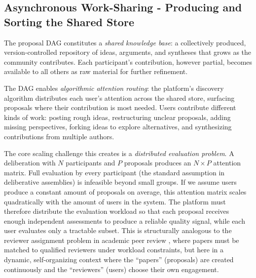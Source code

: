 \documentclass[a4paper, 12pt, twoside]{iviathesis}
\begin{document}
\subsection{Asynchronous Work-Sharing - Producing and Sorting the Shared Store}
\label{sec:async-work-sharing}

The proposal DAG constitutes a \textit{shared knowledge base}: a collectively produced, version-controlled repository of ideas, arguments, and syntheses that grows as the community contributes. Each participant's contribution, however partial, becomes available to all others as raw material for further refinement.

The DAG enables \textit{algorithmic attention routing}: the platform's discovery algorithm distributes each user's attention across the shared store, surfacing proposals where their contribution is most needed. Users contribute different kinds of work: posting rough ideas, restructuring unclear proposals, adding missing perspectives, forking ideas to explore alternatives, and synthesizing contributions from multiple authors.

The core scaling challenge this creates is a \textit{distributed evaluation problem}. A deliberation with $N$ participants and $P$ proposals produces an $N \times P$ attention matrix. Full evaluation by every participant (the standard assumption in deliberative assemblies) is infeasible beyond small groups. If we assume users produce a constant amount of proposals on average, this attention matrix scales quadratically with the amount of users in the system. The platform must therefore distribute the evaluation workload so that each proposal receives enough independent assessments to produce a reliable quality signal, while each user evaluates only a tractable subset. This is structurally analogous to the reviewer assignment problem in academic peer review \cite{charlin2013}, where papers must be matched to qualified reviewers under workload constraints, but here in a dynamic, self-organizing context where the ``papers'' (proposals) are created continuously and the ``reviewers'' (users) choose their own engagement.
\end{document}
